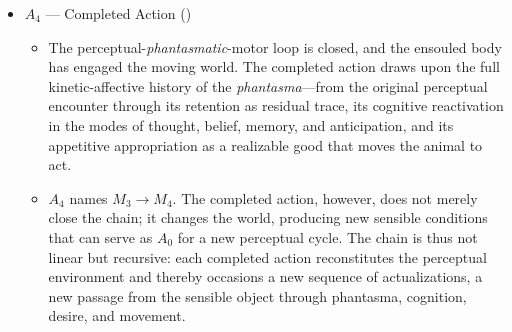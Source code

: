   \begin{itemize}
      \item $A_4$ --- Completed Action ()
      \begin{itemize}
          \item The perceptual-\textit{phantasmatic}-motor loop is closed, and the
          ensouled body has engaged the moving world. The completed action draws upon
          the full kinetic-affective history of the \textit{phantasma}---from the
          original perceptual encounter through its retention as residual trace,
          its cognitive reactivation in the modes of thought, belief, memory, and
          anticipation, and its appetitive appropriation as a realizable good that
          moves the animal to act.
          \item $A_4$ names $M_3 \rightarrow M_4$. The completed action, however,
          does not merely close the chain; it changes the world, producing new
          sensible conditions that can serve as $A_0$ for a new perceptual cycle.
          The chain is thus not linear but recursive: each completed action
          reconstitutes the perceptual environment and thereby occasions a new
          sequence of actualizations, a new passage from the sensible object through
          phantasma, cognition, desire, and movement.
      \end{itemize}
  \end{itemize}
